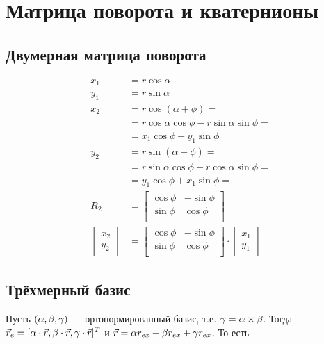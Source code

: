 \section{Матрица поворота и кватернионы}
\subsection{Двумерная матрица поворота}
\begin{align*}
    x_1 & = r \cos \alpha \\
    y_1 & = r \sin \alpha \\
    x_2
    & = r \cos (\alpha + \phi) = \\
    & = r \cos \alpha \cos \phi - r \sin \alpha \sin \phi = \\
    & = x_1 \cos \phi - y_1 \sin \phi \\
    y_2
    & = r \sin (\alpha + \phi) = \\
    & = r \sin \alpha \cos \phi + r \cos \alpha \sin \phi = \\
    & = y_1 \cos \phi + x_1 \sin \phi = \\
    R_2 & =
    \begin{bmatrix}
        \cos \phi & -\sin \phi \\
        \sin \phi & \cos \phi \\
    \end{bmatrix} \\
    \begin{bmatrix} x_2 \\ y_2 \end{bmatrix}
    & =
    \begin{bmatrix}
        \cos \phi & -\sin \phi \\
        \sin \phi & \cos \phi \\
    \end{bmatrix} \cdot
    \begin{bmatrix} x_1 \\ y_1 \end{bmatrix}
\end{align*}

\subsection{Трёхмерный базис}
Пусть $(\alpha, \beta, \gamma)$
--- ортонормированный базис,
т.е. $\gamma = \alpha \times \beta$.
Тогда
$\vec{r}_e = [
    \alpha \cdot \vec{r},
    \beta \cdot \vec{r},
    \gamma \cdot \vec{r}]^T$
и
$\vec{r} = \alpha r_{ex} + \beta r_{ex} + \gamma r_{ex}$.
То есть

